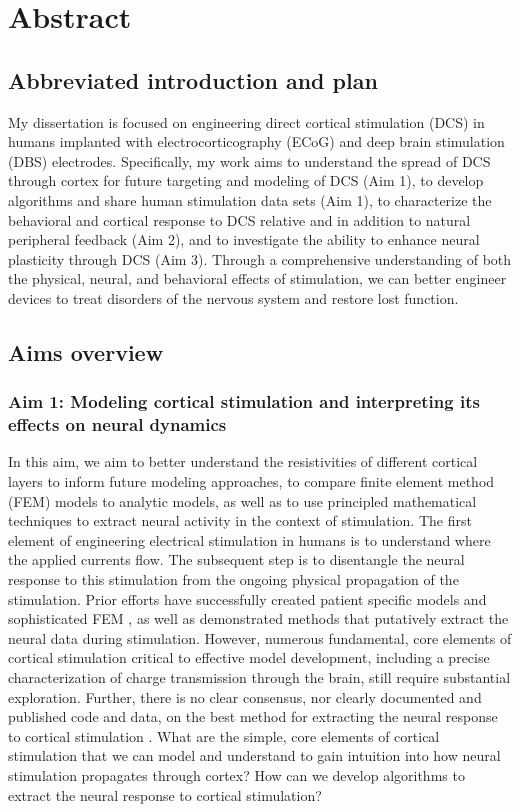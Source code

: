 
 
\chapter {Abstract}

\section{Abbreviated introduction and plan}


My dissertation is focused on engineering direct cortical stimulation (DCS) in humans implanted with electrocorticography (ECoG) and deep brain stimulation (DBS) electrodes. Specifically, my work aims to understand the spread of DCS through cortex for future targeting and modeling of DCS (Aim 1), to develop algorithms and share human stimulation data sets (Aim 1), to characterize the behavioral and cortical response to DCS relative and in addition to natural peripheral feedback (Aim 2), and to investigate the ability to enhance neural plasticity through DCS (Aim 3). Through a comprehensive understanding of both the physical, neural, and behavioral effects of stimulation, we can better engineer devices to treat disorders of the nervous system and restore lost function. 


\section{Aims overview}


\subsection{Aim 1: Modeling cortical stimulation and interpreting its effects on neural dynamics}


In this aim, we aim to better understand the resistivities of different cortical layers to inform future modeling approaches, to compare finite element method (FEM) models to analytic models, as well as to use principled mathematical techniques to extract neural activity in the context of stimulation. The first element of engineering electrical stimulation in humans is to understand where the applied currents flow. The subsequent step is to disentangle the neural response to this stimulation from the ongoing physical propagation of the stimulation. Prior efforts have successfully created patient specific models and sophisticated FEM \cite{Kim2015}, as well as demonstrated methods that putatively extract the neural data during stimulation. However, numerous fundamental, core elements of cortical stimulation critical to effective model development, including a precise characterization of charge transmission through the brain, still require substantial exploration. Further, there is no clear consensus, nor clearly documented and published code and data, on the best method for extracting the neural response to cortical stimulation \cite{Zhou2018}. What are the simple, core elements of cortical stimulation that we can model and understand to gain intuition into how neural stimulation propagates through cortex? How can we develop algorithms to extract the neural response to cortical stimulation?


